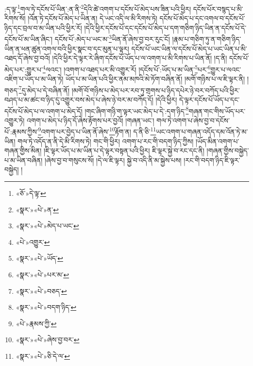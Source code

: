 :ད་ལྟ་\footnote{«ཅོ་»དེ་ལྟ་}གལ་ཏེ་དངོས་པོ་ཡིན་:ན་ནི་\footnote{«སྣར་»«པེ་»ན་}དེའི་ཚེ་འགག་པ་དངོས་པོ་མེད་པས་ཟིན་པའི་ཕྱིར། དངོས་པོར་བསྙད་པ་མི་རིགས་སོ། །འོན་ཏེ་དངོས་པོ་མེད་པ་ཡིན་ན། དེ་ཡང་འདི་ལ་མི་རིགས་ཏེ། དངོས་པོ་མེད་པ་དང་འགལ་བ་དངོས་པོ་ཉིད་དང་བྲལ་བ་མ་ཡིན་པའི་ཕྱིར་རོ། །དེའི་ཕྱིར་དངོས་པོ་དང་དངོས་པོ་མེད་པ་དག་གཅིག་ཉིད་ཡིན་ན་དངོས་པོ་དེ་དངོས་པོ་མ་ཡིན་ཞིང་། དངོས་པོ་:མེད་པ་ཡང་མ་\footnote{«སྣར་»«པེ་»མེད་པ་ཡང་}ཡིན་ནོ་ཞེས་བྱ་བར་རུང་ངོ། །རྣམ་པ་གཅིག་ཏུ་ན་གཅིག་ཉིད་ཡིན་ན་ཕན་ཚུན་འགལ་བའི་ཕྱིར་སྣང་བ་དང་མུན་པ་ལྟར། དངོས་པོ་ཡང་ཡིན་ལ་དངོས་པོ་མེད་པ་ཡང་ཡིན་པ་མི་འཐད་དོ་ཞེས་བྱ་བའོ། །དེའི་ཕྱིར་དེ་ལྟར་རེ་ཞིག་དངོས་པོ་ཡོད་པ་ལ་འགག་པ་མི་རིགས་པ་ཡིན་ནོ། །ད་ནི། དངོས་པོ་མེད་པར་:གྱུར་པ་\footnote{«པེ་»འགྱུར་}ལའང་། །འགག་པ་འཐད་པར་མི་འགྱུར་རོ། །དངོས་པོ་:ཡོད་པ་མ་ཡིན་\footnote{«སྣར་»«པེ་»ཡོད་}པར་\footnote{«སྣར་»«པེ་»པར་མ་}གྱུར་པ་ལའང་འཇིག་པ་ཡོད་པ་མ་ཡིན་ཏེ། ཡོད་པ་མ་ཡིན་པའི་ཕྱིར་ནམ་མཁའི་མེ་ཏོག་བཞིན་ནོ། །མགོ་གཉིས་པ་ལ་ཇི་ལྟར་ནི། །གཅད་\footnote{«སྣར་»«པེ་»བཅད་}དུ་མེད་པ་དེ་བཞིན་ནོ། །མགོ་བོ་གཉིས་པ་མེད་པར་རབ་ཏུ་གྲགས་པ་ཉིད་དཔེར་ཉེ་བར་བཀོད་པའི་ཕྱིར་བཤད་པ་མ་ཚང་བ་ཉིད་དུ་འགྱུར་བས་མེད་པ་ཞེས་ཉེ་བར་མ་བཀོད་དོ། །དེའི་ཕྱིར། དེ་ལྟར་དངོས་པོ་ཡོད་པ་དང་དངོས་པོ་མེད་པ་ལ་འགག་པ་མེད་དོ། །གང་ཞིག་གཉི་ག་ལྟར་ཡང་མེད་པ་དེ་:དག་ཉིད་\footnote{«སྣར་»«པེ་»བདག་ཉིད་}གཞན་གང་གིས་ཡོད་པར་འགྱུར་ཏེ། འགག་པ་མེད་པ་ཉིད་དོ་ཞེས་རྟོགས་པར་བྱའོ། །གཞན་ཡང་། གལ་ཏེ་འགག་པ་ཞེས་བྱ་བ་དངོས་པོ་:རྣམས་ཀྱིས་\footnote{«པེ་»རྣམས་ཀྱི་}འགག་པར་བྱེད་པ་ཡིན་ནོ་ཞེས་\footnote{«སྣར་»«པེ་»ཞེས་བྱ་བར་}རྟོག་ན། ད་ནི་ཅི་\footnote{«སྣར་»«པེ་»ཅི་དེ་ལ་}ཡང་འགག་པ་གཞན་འདོད་དམ་འོན་ཏེ་མ་ཡིན། གལ་ཏེ་འདོད་ན་ནི་དེ་མི་རིགས་ཏེ། གང་གི་ཕྱིར། འགག་པ་རང་གི་བདག་ཉིད་ཀྱིས། །ཡོད་མིན་འགག་པ་གཞན་གྱིས་མིན། །ཇི་ལྟར་ཡོད་པ་མ་ཡིན་པ་དེ་ལྟར་བསྟན་པའི་ཕྱིར། ཇི་ལྟར་སྐྱེ་བ་རང་དང་ནི། །གཞན་གྱིས་བསྐྱེད་པ་མ་ཡིན་བཞིན། །ཞེས་བྱ་བ་གསུངས་སོ། །དེ་ལ་ཇི་ལྟར། སྐྱེ་བ་འདི་ནི་མ་སྐྱེས་པས། །རང་གི་བདག་ཉིད་ཇི་ལྟར་བསྐྱེད། །
